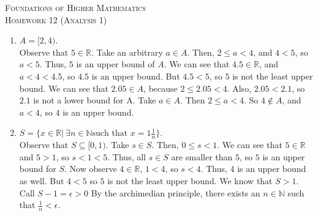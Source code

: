\documentclass{article}
\theoremstyle{problem}
\theoremstyle{plain}
\theoremstyle{remark}
\begin{document}
\begin{center}
  \textsc{\Large Foundations of Higher Mathematics}\\[.3cm]
  \textsc{\Large Homework 12 (Analysis 1)}
\end{center}

\begin{enumerate}
\item $A = [2,4)$.\\
  Observe that $5 \in \mathbb{R}$.
  Take an arbitrary $a \in A$.
  Then, $2 \leq a < 4$, and $4 < 5$, so $a < 5$.
  Thus, $5$ is an upper bound of $A$.
  We can see that $4.5 \in \mathbb{R}$, and $a < 4 < 4.5$, so $4.5$ is an upper bound.
  But $4.5 < 5$, so $5$ is not the least upper bound.
  We can see that $2.05 \in A$, because $2 \leq 2.05 < 4$.
  Also, $2.05 < 2.1$, so $2.1$ is not a lower bound for A.
  Take $a \in A$. Then $2 \leq a < 4$. So $4 \not \in A$, and $a < 4$, so $4$ is an upper bound.
\item $S = \{x \in \mathbb{R}|\ \exists n \in \mathbb{N} \text{such that } x = 1 \frac{1}{n}\}$.\\
  Observe that $S \subseteq [0,1)$. %
    Take $s \in S$.
    Then, $0 \leq s < 1$.
    We can see that $5 \in \mathbb{R}$ and $5 > 1$, so $s < 1 < 5$.
    Thus, all $s \in S$ are smaller than $5$, so $5$ is an upper bound for $S$.
    Now observe $4 \in \mathbb{R}$, $1 < 4$, so $s < 4$.
    Thus, $4$ is an upper bound as well.
    But $4 < 5$ so $5$ is not the least upper bound.
    We know that $S > 1$.
    Call $S - 1 = \epsilon > 0$
    By the archimedian principle, there exists an $n \in \mathbb{N}$ such that $\frac{1}{n} < \epsilon$.
    


\end{enumerate}
\end{document}
